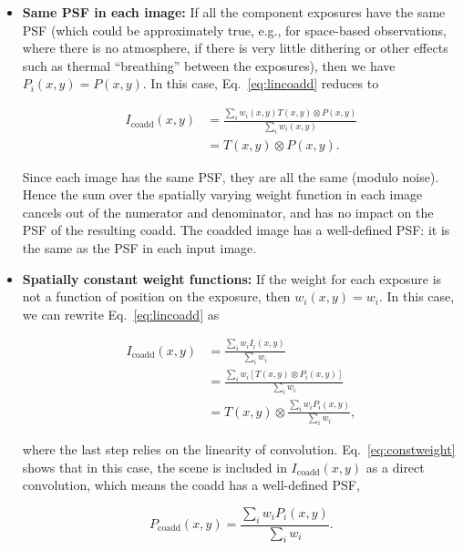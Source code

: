 \documentclass{aastex63}
\begin{document}
\begin{itemize}
    \item \textbf{Same PSF in each image:} If all the component exposures have the same PSF (which could be approximately true, e.g., for space-based observations, where there is no atmosphere, if there is very little dithering or other effects such as thermal ``breathing'' between the exposures), then we have $P_i(x,y)=P(x,y)$.  In this case, Eq.~\eqref{eq:lincoadd} reduces to
    \begin{linenomath}\begin{align*}
         I_\text{coadd}(x,y) &= \frac{\sum_i w_i(x,y) T(x,y)\otimes P(x,y)}{\sum_i w_i(x,y)} \\
         &= T(x,y)\otimes P(x,y).
    \end{align*}\end{linenomath}
    Since each image has the same PSF, they are all the same (modulo noise).  Hence the sum over the spatially varying weight function in each image cancels out of the numerator and denominator, and has no impact on the PSF of the resulting coadd.  The coadded image has a well-defined PSF: it is the same as the PSF in each input image.
    
    \item \textbf{Spatially constant weight functions:}  If the weight for each exposure is not a function of position on the exposure, then  $w_i(x,y)=w_i$.  In this case, we can rewrite Eq.~\eqref{eq:lincoadd} as
    \begin{linenomath}\begin{align}
        I_\text{coadd}(x,y) &= \frac{\sum_i w_i I_i(x,y)}{\sum_i w_i} \nonumber\\
        &= \frac{\sum_i w_i \left[T(x,y) \otimes P_i(x,y)\right]}{\sum_i w_i} \nonumber \\
        &= T(x,y) \otimes \frac{\sum_i w_i P_i(x,y)}{\sum_i w_i},\label{eq:constweight}
    \end{align}\end{linenomath}
    where the last step relies on the linearity of convolution.  
    Eq.~\eqref{eq:constweight} shows that in this case, the scene is included in $I_\text{coadd}(x,y)$ as a direct convolution, which means the coadd has a well-defined PSF, 
    \begin{linenomath}\begin{equation}\label{eq:constweightpsf}
        P_\text{coadd}(x,y) = \frac{\sum_i w_i P_i(x,y)}{\sum_i w_i}.
    \end{equation}\end{linenomath}


\end{itemize}
\end{document}
